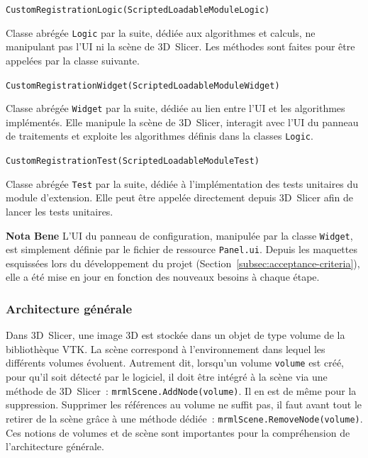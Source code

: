\documentclass{article}
\newcommand{\method}[1]{\hspace{1in}\texttt{#1}\bigskip}
\begin{document}
{{{            \bigskip
            \method{CustomRegistrationLogic(ScriptedLoadableModuleLogic)}

            Classe abrégée \texttt{Logic} par la suite, dédiée aux algorithmes et calculs, ne manipulant pas l'UI ni la scène de 3D~Slicer. Les méthodes sont faites pour être appelées par la classe suivante.

            \bigskip
            \method{CustomRegistrationWidget(ScriptedLoadableModuleWidget)}

            Classe abrégée \texttt{Widget} par la suite, dédiée au lien entre l'UI et les algorithmes implémentés. Elle manipule la scène de 3D~Slicer, interagit avec l'UI du panneau de traitements et exploite les algorithmes définis dans la classes \texttt{Logic}.

            \bigskip
            \method{CustomRegistrationTest(ScriptedLoadableModuleTest)}

            Classe abrégée \texttt{Test} par la suite, dédiée à l'implémentation des tests unitaires du module d'extension. Elle peut être appelée directement depuis 3D~Slicer afin de lancer les tests unitaires.

            \bigskip

            \textbf{Nota Bene} L'UI du panneau de configuration, manipulée par la classe \texttt{Widget}, est simplement définie par le fichier de ressource \texttt{Panel.ui}. Depuis les maquettes esquissées lors du développement du projet (Section~\ref{subsec:acceptance-criteria}), elle a été mise en jour en fonction des nouveaux besoins à chaque étape.
        }

        {
            \subsubsection{Architecture générale}
            \label{subsubsec:general-architecture}

            Dans 3D~Slicer, une image 3D est stockée dans un objet de type volume de la bibliothèque VTK. La scène correspond à l'environnement dans lequel les différents volumes évoluent. Autrement dit, lorsqu'un volume \texttt{volume} est créé, pour qu'il soit détecté par le logiciel, il doit être intégré à la scène via une méthode de 3D~Slicer~: \texttt{mrmlScene.AddNode(volume)}. Il en est de même pour la suppression. Supprimer les références au volume ne suffit pas, il faut avant tout le retirer de la scène grâce à une méthode dédiée~: \texttt{mrmlScene.RemoveNode(volume)}. Ces notions de volumes et de scène sont importantes pour la compréhension de l'architecture générale.

}}}
\end{document}
